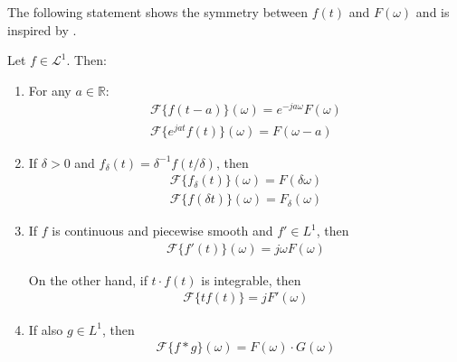 \noindent
The following statement shows the symmetry between $f(t)$ and $F(\omega)$ and is inspired by \cite{page 214, FAA}.

\begin{theorem} \label{theorem:fund_Fourier}
Let $f \in \mathcal{L}^1$. Then:

\begin{enumerate}[label=(\alph*)]
\item For any $a \in \mathbb{R}$:
\begin{align*}
\mathcal{F}\{f(t-a)\}(\omega) = e^{-ja\omega} F(\omega) \\
\mathcal{F}\{e^{jat}f(t)\}(\omega) = F(\omega - a)
\end{align*}

\item If $\delta > 0$ and $f_\delta(t)=\delta^{-1}f(t/\delta)$, then
\begin{align*}
\mathcal{F}\{f_\delta(t)\}(\omega) = F(\delta\omega) \\
\mathcal{F}\{f(\delta t)\}(\omega) = F_\delta(\omega)
\end{align*}

\item If $f$ is continuous and piecewise smooth and $f' \in L^1$, then
\begin{align*}
\mathcal{F}\{f'(t)\}(\omega) = j\omega F(\omega)
\end{align*}

On the other hand, if $t\cdot f(t)$ is integrable, then
\begin{align*}
\mathcal{F}\{tf(t)\} = j F'(\omega)
\end{align*}

\item If also $g \in L^1$, then
\begin{align*}
\mathcal{F}\{f*g\}(\omega) = F(\omega) \cdot G(\omega)
\end{align*}
\end{enumerate}
\end{theorem}

